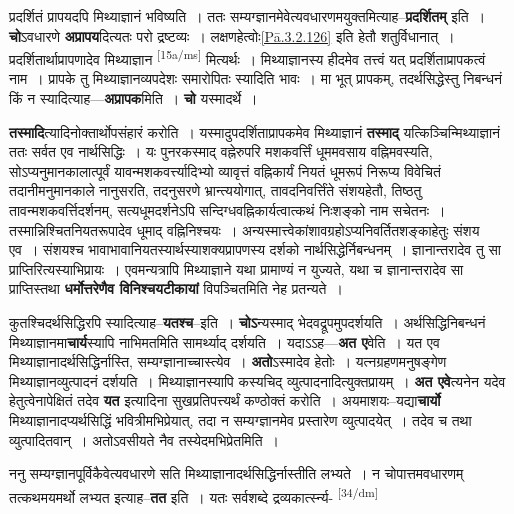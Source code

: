 \documentclass[article,12pt,a4paper]{memoir}
\begin{document}
	  \pstart प्रदर्शितं प्रापयदपि मिथ्याज्ञानं भविष्यति । ततः सम्यग्ज्ञानमेवेत्यवधारणमयुक्तमित्याह--\textbf{प्रदर्शितम्} इति । \textbf{चो}ऽवधारणे \textbf{अप्रापय}दित्यतः परो द्रष्टव्यः । लक्षणहेत्वोः\cref{Pā.3.2.126} इति हेतौ शतुर्विधानात् । प्रदर्शितार्थाप्रापणादेव मिथ्याज्ञान \leavevmode\textsuperscript{\rmlatinfont\tiny [15a/ms]} मित्यर्थः । मिथ्याज्ञानस्य हीदमेव तत्त्वं यत् प्रदर्शिताप्रापकत्वं नाम । प्रापके तु मिथ्याज्ञानव्यपदेशः समारोपितः स्यादिति भावः । मा भूत् प्रापकम्, तदर्थसिद्धेस्तु निबन्धनं किं न स्यादित्याह—\textbf{अप्रापक}मिति । \textbf{चो} यस्मादर्थे ।
	\pend
      

	  \pstart \textbf{तस्मादि}त्यादिनोक्तार्थोपसंहारं करोति । यस्मादुपदर्शिताप्रापकमेव मिथ्याज्ञानं \textbf{तस्माद्} यत्किञ्चिन्मिथ्याज्ञानं ततः सर्वत एव नार्थसिद्धिः । यः पुनरकस्माद् वह्नेरुपरि मशकवर्त्तिं धूममवसाय वह्निमवस्यति, सोऽप्यनुमानकालात्पूर्वं यावन्मशकवर्त्त्यादिभ्यो व्यावृत्तं वह्निकार्यं नियतं धूमरूपं निरूप्य विवेचितं तदानीमनुमानकाले नानुसरति, तदनुसरणे भ्रान्त्ययोगात्, तावदनिवर्त्तिंते संशयहेतौ, तिष्ठतु तावन्मशकवर्त्तिदर्शनम्, सत्यधूमदर्शनेऽपि सन्दिग्धवह्निकार्यत्वात्कथं निःशङ्को नाम सचेतनः । तस्मान्निश्चितनियतरूपादेव धूमाद् वह्निनिश्चयः । अन्यस्मात्त्वेकांशावग्रहोऽप्यनिवर्तितशङ्काहेतुः संशय एव । संशयश्च भावाभावानियतस्यार्थस्याशक्यप्रापणस्य दर्शको नार्थसिद्धेर्निबन्धनम् । ज्ञानान्तरादेव तु सा प्राप्तिरित्यस्याभिप्रायः । एवमन्यत्रापि मिथ्याज्ञाने यथा प्रामाण्यं न युज्यते, यथा च ज्ञानान्तरादेव सा प्राप्तिस्तथा \textbf{धर्मोत्तरेणैव विनिश्चयटीकायां} विपञ्चितमिति नेह प्रतन्यते ।
	\pend
      

	  \pstart कुतश्चिदर्थसिद्धिरपि स्यादित्याह--\textbf{यतश्च}--इति । \textbf{चोऽ}न्यस्माद् भेदवद्रूपमुपदर्शयति । अर्थसिद्धिनिबन्धनं मिथ्याज्ञानमा\textbf{चार्य}स्यापि नाभिमतमिति सामर्थ्याद् दर्शयति । यदाऽऽह—\textbf{अत ए}वेति । यत एव मिथ्याज्ञानादर्थसिद्धिर्नास्ति, सम्यग्ज्ञानाच्चास्त्येव । \textbf{अतो}ऽस्मादेव हेतोः । यत्नग्रहणमनुषङ्गेण मिथ्याज्ञानव्युत्पादनं दर्शयति । मिथ्याज्ञानस्यापि कस्यचिद् व्युत्पादनादित्युक्तप्रायम् । \textbf{अत एवे}त्यनेन यदेव हेतुत्वेनापेक्षितं तदेव \textbf{यत} इत्यादिना सुखप्रतिपत्त्यर्थं कण्ठोक्तं करोति । अयमाशयः--यद्या\textbf{चार्यो} मिथ्याज्ञानादप्यर्थसिद्धिं भवित्रीमभिप्रेयात्, तदा न सम्यग्ज्ञानमेव प्रस्तारेण व्युत्पादयेत् । तदेव च तथा व्युत्पादितवान् । अतोऽवसीयते नैव तस्येदमभिप्रेतमिति ।
	\pend
      

	  \pstart ननु सम्यग्ज्ञानपूर्विकैवेत्यवधारणे सति मिथ्याज्ञानादर्थसिद्धिर्नास्तीति लभ्यते । न चोपात्तमवधारणम् तत्कथमयमर्थो लभ्यत इत्याह--\textbf{तत} इति । यतः सर्वशब्दे द्रव्यकार्त्स्न्य- \leavevmode\textsuperscript{\rmlatinfont\tiny [34/dm]} 
	  
\end{document}
